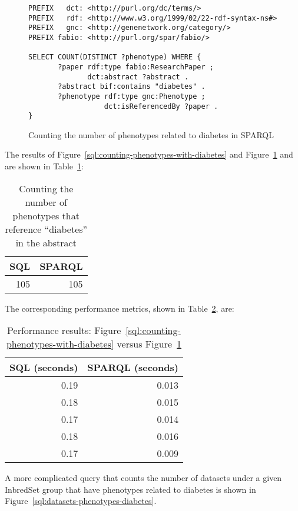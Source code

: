 \begin{figure}[H]
\centering
\begin{verbatim}
PREFIX   dct: <http://purl.org/dc/terms/>
PREFIX   rdf: <http://www.w3.org/1999/02/22-rdf-syntax-ns#>
PREFIX   gnc: <http://genenetwork.org/category/>
PREFIX fabio: <http://purl.org/spar/fabio/>

SELECT COUNT(DISTINCT ?phenotype) WHERE {
       ?paper rdf:type fabio:ResearchPaper ;
              dct:abstract ?abstract .
       ?abstract bif:contains "diabetes" .
       ?phenotype rdf:type gnc:Phenotype ;
                  dct:isReferencedBy ?paper .
}
\end{verbatim}
\caption{Counting the number of phenotypes related to diabetes in SPARQL}\label{sparql:counting-phenotypes-with-diabetes}
\end{figure}

The results of Figure~\ref{sql:counting-phenotypes-with-diabetes} and Figure~\ref{sparql:counting-phenotypes-with-diabetes} and are shown in Table~\ref{table:counting-phenotypes-with-diabetes}:

\begin{table}[H]
\begin{tabular}{rr}
SQL & SPARQL \\[0pt]
\toprule
105 & 105\\[0pt]
\end{tabular}
\caption{Counting the number of phenotypes that reference ``diabetes'' in the abstract}\label{table:counting-phenotypes-with-diabetes}
\end{table}

The corresponding performance metrics, shown in Table~\ref{table:perf-2}, are:

\begin{table}[H]
\begin{tabular}{rr}
SQL (seconds) & SPARQL (seconds)\\[0pt]
\toprule
0.19 & 0.013\\[0pt]
0.18 & 0.015\\[0pt]
0.17 & 0.014\\[0pt]
0.18 & 0.016\\[0pt]
0.17 & 0.009\\[0pt]
\end{tabular}
\caption{Performance results: Figure~\ref{sql:counting-phenotypes-with-diabetes} versus Figure~\ref{sparql:counting-phenotypes-with-diabetes} }\label{table:perf-2}
\end{table}

A more complicated query that counts the number of datasets under a given InbredSet group that have phenotypes related to diabetes is shown in Figure~\ref{sql:datasets-phenotypes-diabetes}.

